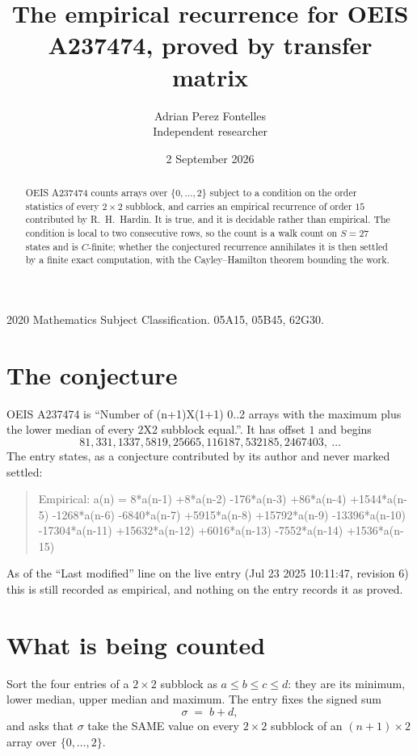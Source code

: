 \documentclass[11pt,a4paper]{article}
\title{The empirical recurrence for OEIS A237474, proved by transfer matrix}
\author{Adrian Perez Fontelles\\ \small Independent researcher}
\date{2 September 2026}
\theoremstyle{plain}
\theoremstyle{definition}
\begin{document}
\maketitle

\begin{abstract}
OEIS A237474 counts arrays over $\{0,\dots,2\}$ subject to a condition on the order
statistics of every $2\times2$ subblock, and carries an empirical recurrence of order
$15$ contributed by R.~H.~Hardin. It is true, and it is decidable rather than empirical.
The condition is local to two consecutive rows, so the count is a walk count on $S=27$
states and is $C$-finite; whether the conjectured recurrence annihilates it is then settled by
a finite exact computation, with the Cayley--Hamilton theorem bounding the work.
\end{abstract}

\noindent\small 2020 Mathematics Subject Classification. 05A15, 05B45, 62G30.\normalsize

\section{The conjecture}

OEIS A237474 is ``Number of (n+1)X(1+1) 0..2 arrays with the maximum plus the lower median of every 2X2 subblock equal.''. It has offset $1$ and begins
\[
81, 331, 1337, 5819, 25665, 116187, 532185, 2467403,\ \dots
\]
The entry states, as a conjecture contributed by its author and never marked settled:
\begin{quote}
Empirical: a(n) = 8*a(n-1) +8*a(n-2) -176*a(n-3) +86*a(n-4) +1544*a(n-5) -1268*a(n-6) -6840*a(n-7) +5915*a(n-8) +15792*a(n-9) -13396*a(n-10) -17304*a(n-11) +15632*a(n-12) +6016*a(n-13) -7552*a(n-14) +1536*a(n-15)
\end{quote}
As of the ``Last modified'' line on the live entry (Jul 23 2025 10:11:47, revision 6) this is still
recorded as empirical, and nothing on the entry records it as proved.

\section{What is being counted}

Sort the four entries of a $2\times2$ subblock as $a\le b\le c\le d$: they
are its minimum, lower median, upper median and maximum. The entry fixes the signed sum
\[
\sigma\;=\;b+d,
\]
and asks that $\sigma$ take the SAME value on every $2\times2$ subblock of an
$(n+1)\times2$ array over $\{0,\dots,2\}$.
\end{document}
